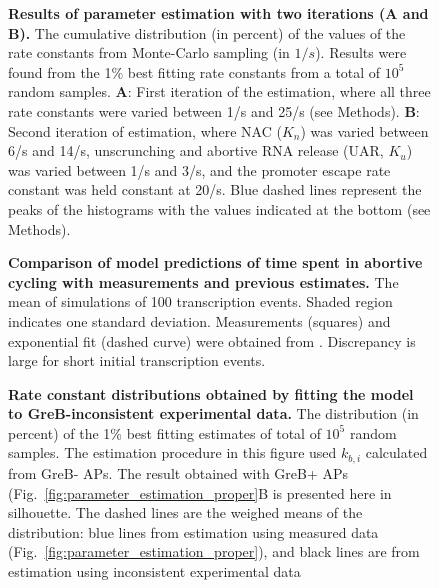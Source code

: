\documentclass{bmcart}
\newcommand{\FIG}{{Fig.}}
\begin{document}
\begin{backmatter}
\begin{figure}[h!]
\begin{center}
    \end{center}
  \caption{{\bf Results of parameter estimation with two iterations (A and
      B).}
      The cumulative distribution (in percent) of the values of the rate
      constants from Monte-Carlo sampling (in
      $1/s$). Results were found from the 1\% best fitting rate constants
      from a total of $10^5$ random samples. \textbf{A}: First iteration of
      the estimation, where all three rate constants were varied between 1/s
      and 25/s (see Methods). \textbf{B}: Second iteration of estimation,
      where NAC ($K_n$) was varied between 6/s and 14/s, unscrunching and
      abortive RNA release (UAR, $K_u$) was varied between 1/s and 3/s, and
      the promoter escape rate constant was held constant at 20/s. Blue dashed
      lines represent the peaks of the histograms with the values
      indicated at the bottom (see Methods). }
      \label{fig:parameter_estimation_two_iterations}
\end{figure}

\begin{figure}[h!]
    \begin{center}
    \end{center}
  \caption{{\bf Comparison of model predictions of time spent in abortive
  cycling with measurements and previous estimates.}
  The mean of simulations of 100 transcription events. Shaded region indicates
  one standard deviation. Measurements (squares) and exponential fit (dashed
  curve) were obtained from \cite{revyakin_abortive_2006}. Discrepancy is
  large for short initial transcription events.}
  \label{fig:revyakin_fit}
\end{figure}


\begin{figure}[h!]
    \begin{center}
    \end{center}
    \caption{
      {\bf Rate constant distributions obtained by fitting the model to
      GreB-inconsistent experimental data.}
      The distribution (in percent) of the 1\% best fitting estimates
      of total of $10^5$ random samples. The estimation procedure in this
      figure used $k_{b,i}$ calculated from GreB- APs. The result obtained
      with GreB+ APs (\FIG~\ref{fig:parameter_estimation_proper}B is presented here in
      silhouette. The dashed lines are the weighed means of the distribution:
      blue lines from estimation using measured data
      (\FIG~\ref{fig:parameter_estimation_proper}), and black
      lines are from estimation using inconsistent experimental data}
\label{fig:GreB_minus_fit}
\end{figure}


\end{backmatter}
\end{document}
